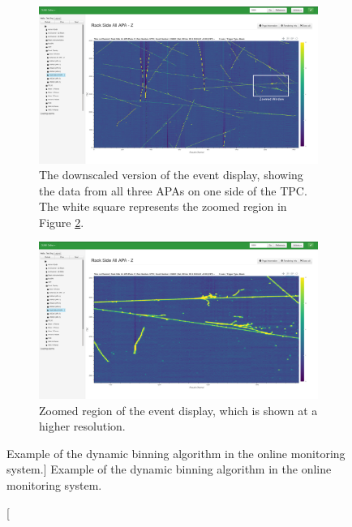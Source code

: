 \begin{figure}

	\centering

	\begin{subfigure}[b]{\textwidth}
		\centering
		\vspace{3mm}
		\includegraphics[width=\textwidth]{figures/zoomed_out.png}
		\caption {The downscaled version of the event display, showing the data from 
		all three APAs on one side of the TPC. The white square represents the 
		zoomed region in Figure \ref{fig:zoomed_in}.}
		\label{fig:zoomed_out}
	\end{subfigure}

	\begin{subfigure}[b]{\textwidth}
		\centering
		\vspace{3mm}
		\includegraphics[width=\textwidth]{figures/zoomed_in.png}
		\caption {Zoomed region of the event display, which is shown at a higher
		resolution.}
		\label{fig:zoomed_in}
	\end{subfigure}

	\caption
	[Example of the dynamic binning algorithm in the \protodune{} online
	monitoring system.]
	{ Example of the dynamic binning algorithm in the \protodune{} online
	monitoring system. }
	\label{fig:dynamic_binning}

\end{figure}

